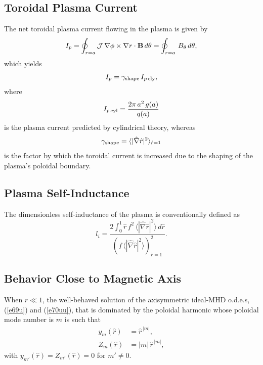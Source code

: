 \documentclass[12pt,prb,aps]{revtex4-1}
\begin{document}
\subsection{Toroidal Plasma Current}
The net toroidal plasma current flowing in the plasma is given by
\begin{equation}\label{ipdef}
I_p = \oint_{r=a}{\cal J}\,\nabla\phi\times\nabla r\cdot{\bf B}\,d\theta = \oint_{r=a}\,B_\theta\,d\theta,
\end{equation}
which yields
\begin{equation}
I_p =\gamma_{\rm shape}\, I_{p\,{\rm cly}},
\end{equation}
where
\begin{equation}
I_{p\,{\rm cyl}} = \frac{2\pi\,a^2\,g(a)}{q(a)}
\end{equation}
is the plasma current predicted by cylindrical theory, whereas
\begin{equation}
\gamma_{\rm shape} = \langle |\hat{\nabla}\hat{r}|^2\rangle_{\hat{r}=1}
\end{equation}
is the factor by which the toroidal  current is increased due to the shaping of the plasma's poloidal
boundary. 

\subsection{Plasma Self-Inductance}\label{sli}
The dimensionless self-inductance of the plasma is conventionally defined as\,\cite{tj}
\begin{equation}
l_i = \frac{2\int_0^1 \hat{r}\,f^2\,\langle |\hat{\nabla}\hat{r}|^2\rangle\,d\hat{r}}{(f\,\langle |\hat{\nabla}\hat{r}|^2\rangle)^2_{\hat{r}=1}}.
\end{equation}

\subsection{Behavior Close to Magnetic Axis}\label{axis}
When $\hat{r}\ll 1$, the well-behaved solution of the axisymmetric ideal-MHD o.d.e.s, (\ref{e69u}) and (\ref{e70uu}), that is dominated by the poloidal harmonic whose poloidal mode number is
$m$ is such that
\begin{align}\label{e234g}
y_m(\hat{r}) &= \hat{r}^{\,|m|},\\[0.5ex]
Z_m(\hat{r}) &= |m|\,\hat{r}^{\,|m|},\label{e235g}
\end{align}
with $y_{m'}(\hat{r})=Z_{m'}(\hat{r})=0$ for $m'\neq 0$. 
\end{document}
